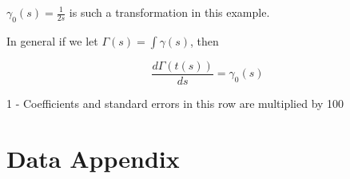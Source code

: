 \documentclass[12pt]{article}
\theoremstyle{definition}
\theoremstyle{definition}
\theoremstyle{definition}
\theoremstyle{definition}
\begin{document}
    $\gamma_0(s) = \frac{1}{2s}$ is such a transformation in this example. 
    
    In general if we let $\Gamma(s) = \int \gamma(s)$, then 
    
    $$ \frac{d \Gamma(t(s)) }{ ds} = \gamma_0(s) $$
    

\begin{table}[ht]
    \centering
    
    \label{tab:teacher_char}
    \bigskip
    
    \footnotesize{1 - Coefficients and standard errors in this row are multiplied by 100}
\end{table}








\pagebreak







\appendix
\captionsetup{labelformat=AppendixTables}


\setcounter{figure}{0}   
\setcounter{table}{0}   

\renewcommand{\thetable}{\arabic{table}}
\renewcommand{\thefigure}{\arabic{figure}}



\section{Data Appendix} \label{data_app}
\end{document}
